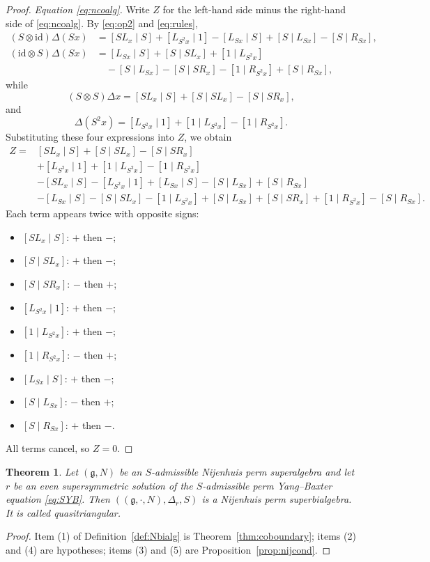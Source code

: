\documentclass[11pt]{article}
\newtheorem{theorem}{Theorem}[section]
\theoremstyle{definition}
\newcommand{\g}{\mathfrak{g}}
\newcommand{\id}{\mathrm{id}}
\begin{document}
\begin{proof}
\emph{Equation \eqref{eq:ncoalg}.}
Write $Z$ for the left-hand side minus the right-hand side of \eqref{eq:ncoalg}. By \eqref{eq:op2} and \eqref{eq:rules},
\[
\begin{aligned}
(S\otimes\id)\Delta(Sx)
&=[SL_x\mid S]+[L_{S^2x}\mid 1]-[L_{Sx}\mid S]+[S\mid L_{Sx}]-[S\mid R_{Sx}],\\
(\id\otimes S)\Delta(Sx)
&=[L_{Sx}\mid S]+[S\mid SL_x]+[1\mid L_{S^2x}]\\
&\quad-[S\mid L_{Sx}]-[S\mid SR_x]-[1\mid R_{S^2x}]+[S\mid R_{Sx}],
\end{aligned}
\]
while
\[
(S\otimes S)\Delta x=[SL_x\mid S]+[S\mid SL_x]-[S\mid SR_x],
\]
and
\[
\Delta(S^2x)=[L_{S^2x}\mid 1]+[1\mid L_{S^2x}]-[1\mid R_{S^2x}].
\]
Substituting these four expressions into $Z$, we obtain
\[
\begin{aligned}
Z={}&[SL_x\mid S]+[S\mid SL_x]-[S\mid SR_x]\\
&+[L_{S^2x}\mid 1]+[1\mid L_{S^2x}]-[1\mid R_{S^2x}]\\
&-[SL_x\mid S]-[L_{S^2x}\mid 1]+[L_{Sx}\mid S]-[S\mid L_{Sx}]+[S\mid R_{Sx}]\\
&-[L_{Sx}\mid S]-[S\mid SL_x]-[1\mid L_{S^2x}]+[S\mid L_{Sx}]+[S\mid SR_x]+[1\mid R_{S^2x}]-[S\mid R_{Sx}].
\end{aligned}
\]
Each term appears twice with opposite signs:
\begin{itemize}[itemsep=0pt]
\item $[SL_x\mid S]$: $+$ then $-$;
\item $[S\mid SL_x]$: $+$ then $-$;
\item $[S\mid SR_x]$: $-$ then $+$;
\item $[L_{S^2x}\mid 1]$: $+$ then $-$;
\item $[1\mid L_{S^2x}]$: $+$ then $-$;
\item $[1\mid R_{S^2x}]$: $-$ then $+$;
\item $[L_{Sx}\mid S]$: $+$ then $-$;
\item $[S\mid L_{Sx}]$: $-$ then $+$;
\item $[S\mid R_{Sx}]$: $+$ then $-$.
\end{itemize}
All terms cancel, so $Z=0$.
\end{proof}

\begin{theorem}\label{thm:main}
Let $(\g,N)$ be an $S$-admissible Nijenhuis perm superalgebra and let $r$ be an even supersymmetric solution of the $S$-admissible perm Yang--Baxter equation \eqref{eq:SYB}. Then $((\g,\cdot,N),\Delta_r,S)$ is a Nijenhuis perm superbialgebra. It is called \emph{quasitriangular}.
\end{theorem}
\begin{proof}
Item (1) of Definition~\ref{def:Nbialg} is Theorem~\ref{thm:coboundary}; items (2) and (4) are hypotheses; items (3) and (5) are Proposition~\ref{prop:nijcond}.
\end{proof}
\end{document}
